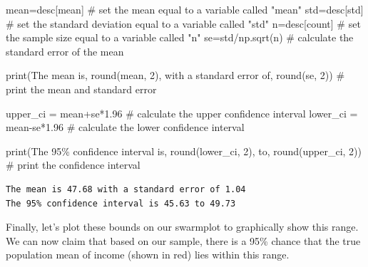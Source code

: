 \documentclass[
  letterpaper,
  DIV=11,
  numbers=noendperiod]{scrreprt}
\newenvironment{Shaded}{\begin{snugshade}}{\end{snugshade}}
\newcommand{\BuiltInTok}[1]{\textcolor[rgb]{0.00,0.23,0.31}{#1}}
\newcommand{\CommentTok}[1]{\textcolor[rgb]{0.37,0.37,0.37}{#1}}
\newcommand{\DecValTok}[1]{\textcolor[rgb]{0.68,0.00,0.00}{#1}}
\newcommand{\FloatTok}[1]{\textcolor[rgb]{0.68,0.00,0.00}{#1}}
\newcommand{\NormalTok}[1]{\textcolor[rgb]{0.00,0.23,0.31}{#1}}
\newcommand{\OperatorTok}[1]{\textcolor[rgb]{0.37,0.37,0.37}{#1}}
\newcommand{\SpecialCharTok}[1]{\textcolor[rgb]{0.37,0.37,0.37}{#1}}
\newcommand{\StringTok}[1]{\textcolor[rgb]{0.13,0.47,0.30}{#1}}
\begin{document}
\begin{Shaded}
\begin{Highlighting}[]
\NormalTok{mean}\OperatorTok{=}\NormalTok{desc[}\StringTok{\textquotesingle{}mean\textquotesingle{}}\NormalTok{] }\CommentTok{\# set the mean equal to a variable called "mean"}
\NormalTok{std}\OperatorTok{=}\NormalTok{desc[}\StringTok{\textquotesingle{}std\textquotesingle{}}\NormalTok{] }\CommentTok{\# set the standard deviation equal to a variable called "std"}
\NormalTok{n}\OperatorTok{=}\NormalTok{desc[}\StringTok{\textquotesingle{}count\textquotesingle{}}\NormalTok{] }\CommentTok{\# set the sample size equal to a variable called "n"}
\NormalTok{se}\OperatorTok{=}\NormalTok{std}\OperatorTok{/}\NormalTok{np.sqrt(n) }\CommentTok{\# calculate the standard error of the mean}

\BuiltInTok{print}\NormalTok{(}\StringTok{\textquotesingle{}The mean is\textquotesingle{}}\NormalTok{, }\BuiltInTok{round}\NormalTok{(mean, }\DecValTok{2}\NormalTok{), }\StringTok{\textquotesingle{}with a standard error of\textquotesingle{}}\NormalTok{, }\BuiltInTok{round}\NormalTok{(se, }\DecValTok{2}\NormalTok{)) }\CommentTok{\# print the mean and standard error}

\NormalTok{upper\_ci }\OperatorTok{=}\NormalTok{ mean}\OperatorTok{+}\NormalTok{se}\OperatorTok{*}\FloatTok{1.96} \CommentTok{\# calculate the upper confidence interval}
\NormalTok{lower\_ci }\OperatorTok{=}\NormalTok{ mean}\OperatorTok{{-}}\NormalTok{se}\OperatorTok{*}\FloatTok{1.96} \CommentTok{\# calculate the lower confidence interval}

\BuiltInTok{print}\NormalTok{(}\StringTok{\textquotesingle{}The 95}\SpecialCharTok{\% c}\StringTok{onfidence interval is\textquotesingle{}}\NormalTok{, }\BuiltInTok{round}\NormalTok{(lower\_ci, }\DecValTok{2}\NormalTok{), }\StringTok{\textquotesingle{}to\textquotesingle{}}\NormalTok{, }\BuiltInTok{round}\NormalTok{(upper\_ci, }\DecValTok{2}\NormalTok{)) }\CommentTok{\# print the confidence interval}
\end{Highlighting}
\end{Shaded}

\begin{verbatim}
The mean is 47.68 with a standard error of 1.04
The 95% confidence interval is 45.63 to 49.73
\end{verbatim}

Finally, let's plot these bounds on our swarmplot to graphically show
this range. We can now claim that based on our sample, there is a 95\%
chance that the true population mean of income (shown in red) lies
within this range.
\end{document}
